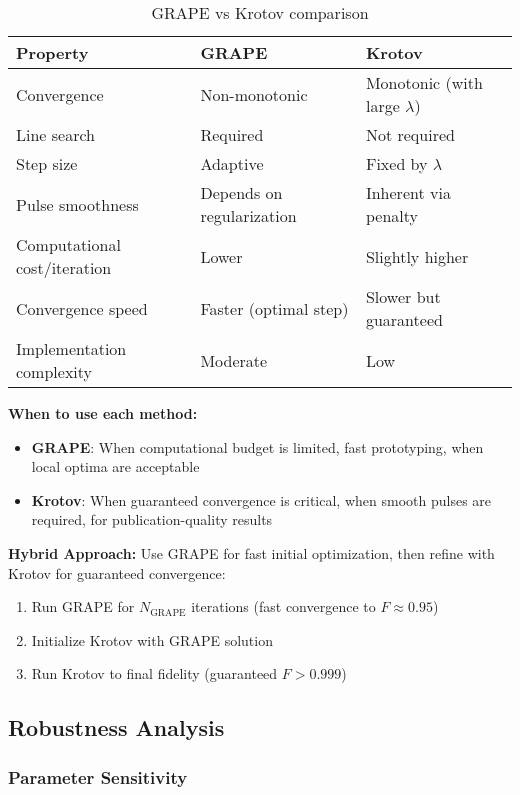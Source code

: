 \documentclass[11pt,a4paper]{article}
\theoremstyle{definition}
\theoremstyle{remark}
\begin{document}
\begin{table}[h]
\centering
\begin{tabular}{lll}
\toprule
\textbf{Property} & \textbf{GRAPE} & \textbf{Krotov} \\
\midrule
Convergence & Non-monotonic & Monotonic (with large $\lambda$) \\
Line search & Required & Not required \\
Step size & Adaptive & Fixed by $\lambda$ \\
Pulse smoothness & Depends on regularization & Inherent via penalty \\
Computational cost/iteration & Lower & Slightly higher \\
Convergence speed & Faster (optimal step) & Slower but guaranteed \\
Implementation complexity & Moderate & Low \\
\bottomrule
\end{tabular}
\caption{GRAPE vs Krotov comparison}
\end{table}

\textbf{When to use each method:}
\begin{itemize}
    \item \textbf{GRAPE}: When computational budget is limited, fast prototyping, when local optima are acceptable
    \item \textbf{Krotov}: When guaranteed convergence is critical, when smooth pulses are required, for publication-quality results
\end{itemize}

\textbf{Hybrid Approach:}
Use GRAPE for fast initial optimization, then refine with Krotov for guaranteed convergence:
\begin{enumerate}
    \item Run GRAPE for $N_{\text{GRAPE}}$ iterations (fast convergence to $F \approx 0.95$)
    \item Initialize Krotov with GRAPE solution
    \item Run Krotov to final fidelity (guaranteed $F > 0.999$)
\end{enumerate}

\subsection{Robustness Analysis}

\subsubsection{Parameter Sensitivity}
\end{document}
